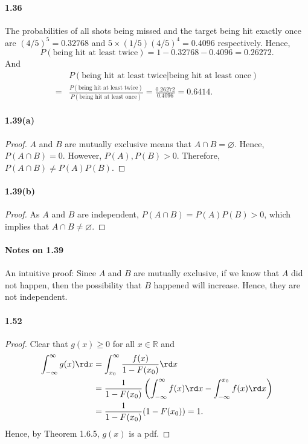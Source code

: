\paragraph{1.36}
\begin{solution}
  The probabilities of all shots being missed and the target being hit exactly
  once are $(4/5)^5=0.32768$ and $5\times(1/5)(4/5)^4=0.4096$ respectively.
  Hence, 
  \[
    P(\text{being hit at least twice}) = 1 - 0.32768 - 0.4096 = 0.26272.
  \]
  And
  \[\begin{split}
    &P(\text{being hit at least twice}|\text{being hit at least once}) \\
    =& \frac{P(\text{being hit at least twice})}
       {P(\text{being hit at least once})}
    = \frac{0.26272}{0.4096} = 0.6414.
  \end{split}\]
\end{solution}

\paragraph{1.39(a)}
\begin{proof}
  $A$ and $B$ are mutually exclusive means that $A\cap B=\varnothing$. Hence,
  $P(A\cap B)=0$. However, $P(A),P(B)>0$. Therefore, $P(A\cap B)\ne P(A)P(B)$.
\end{proof}
\paragraph{1.39(b)}
\begin{proof}
  As $A$ and $B$ are independent, $P(A\cap B)=P(A)P(B)>0$, which implies that 
  $A\cap B\ne\varnothing$.
\end{proof}
\paragraph{Notes on 1.39}
  An intuitive proof: Since $A$ and $B$ are mutually exclusive, if we know that
  $A$ did not happen, then the possibility that $B$ happened will increase. 
  Hence, they are not independent.

\paragraph{1.52}
\begin{proof}
  Clear that $g(x)\ge 0$ for all $x\in\mathbb{R}$ and
  \[\begin{split}
    \int_{-\infty}^\infty g(x)\rd x 
    &= \int_{x_0}^\infty \frac{f(x)}{1-F(x_0)} \rd x \\
    &= \frac{1}{1-F(x_0)}\left(
         \int_{-\infty}^\infty f(x)\rd x - \int_{-\infty}^{x_0}f(x)\rd x 
       \right) \\
    &= \frac{1}{1-F(x_0)}(1- F(x_0)) = 1.
  \end{split}\]
  Hence, by Theorem 1.6.5, $g(x)$ is a pdf.
\end{proof}